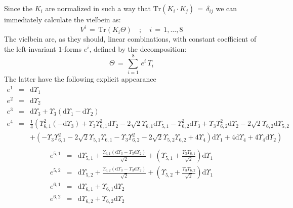 \documentclass[10pt,a4paper]{article}
\begin{document}
Since the $K_i$ are normalized in such a way that $\mathrm{Tr}(K_i\cdot K_j)\, = \, \delta_{ij}$ we can immediately calculate the vielbein as:
\begin{equation}\label{cardigan}
  V^i \, = \, \text{Tr} \left(K_i \Theta \right) \quad ; \quad i\, = \, 1,\dots , 8
\end{equation}
The vielbein are, as they should, linear combinations, with constant coefficient of the left-invariant $1$-forms $e^i$, defined by the decomposition:
\begin{equation}\label{defiforme}
  \Theta \, = \, \sum_{i=1}^8 \, e^i \, T_i
\end{equation}
The latter have the following explicit appearance
\begin{eqnarray}
\label{mc1formeA}
  e^1 &=& \mathrm{d}\Upsilon_1  \nonumber\\
  e^2  &=& \mathrm{d}\Upsilon_2 \nonumber\\
  e^3 &=& \mathrm{d}\Upsilon_3+\Upsilon_3 (\mathrm{d}\Upsilon_1-\mathrm{d}\Upsilon_2) \nonumber\\
  e^4 &=& \frac{1}{4} \left(\Upsilon_{6,1}^2 (-\mathrm{d}\Upsilon_3)+\Upsilon_3 \Upsilon_{6,1}^2
   \mathrm{d}\Upsilon_2-2 \sqrt{2} \Upsilon_{6,1} \mathrm{d}\Upsilon_{5,1}-\Upsilon_{6,2}^2
   \mathrm{d}\Upsilon_3+\Upsilon_3 \Upsilon_{6,2}^2 \mathrm{d}\Upsilon_2-2 \sqrt{2} \Upsilon_
   {6,2} \mathrm{d}\Upsilon_{5,2}\right.\nonumber\\
   &&\left.+\left(-\Upsilon_3 \Upsilon_{6,1}^2-2 \sqrt{2} \Upsilon_{5,1} \Upsilon_{6,1}-\Upsilon_3 \Upsilon_{6,2}^2-2 \sqrt{2} \Upsilon_{5,2} \Upsilon_{6,2}+4 \Upsilon_4\right) \mathrm{d}\Upsilon_1+4 \mathrm{d}\Upsilon_4+4 \Upsilon_4
   \mathrm{d}\Upsilon_2\right)\nonumber\\
\end{eqnarray}
\begin{eqnarray}
\label{mc1formeB}
  e^{5,1} &=& \mathrm{d}\Upsilon_{5,1}+\frac{\Upsilon_{6,1} (\mathrm{d}\Upsilon_3-\Upsilon_3 \mathrm{d}\Upsilon_2
   )}{\sqrt{2}}+\left(\Upsilon_{5,1}+\frac{\Upsilon_3 \Upsilon_{6,1}}{\sqrt{2}}\right) \mathrm{d}\Upsilon_1 \nonumber\\
  e^{5,2} &=& \mathrm{d}\Upsilon_{5,2}+\frac{\Upsilon_{6,2} (\mathrm{d}\Upsilon_3-\Upsilon_3 \mathrm{d}\Upsilon_2)}{\sqrt{2}}+\left(\Upsilon_{5,2}
  +\frac{\Upsilon_3 \Upsilon_{6,2}}{\sqrt{2}}\right) \mathrm{d}\Upsilon_1 \nonumber\\
  e^{6,1} &=& \mathrm{d}\Upsilon_{6,1}+\Upsilon_{6,1} \mathrm{d}\Upsilon_2 \nonumber\\
  e^{6,2} &=& \mathrm{d}\Upsilon_{6,2}+\Upsilon_{6,2} \mathrm{d}\Upsilon_2
\end{eqnarray}
\end{document}
